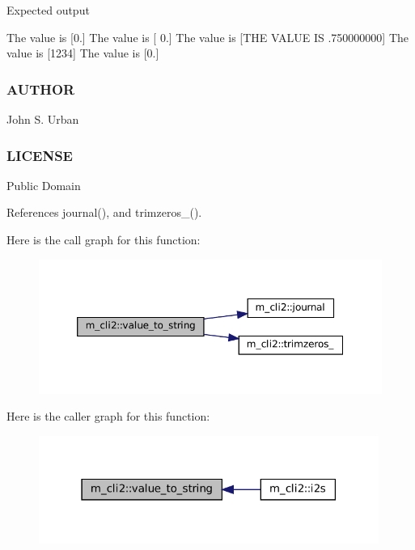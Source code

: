 Expected output

The value is \mbox{[}0.\mbox{]} The value is \mbox{[} 0.\mbox{]} The value is \mbox{[}T\+HE V\+A\+L\+UE IS .750000000\mbox{]} The value is \mbox{[}1234\mbox{]} The value is \mbox{[}0.\mbox{]}

\subsubsection*{A\+U\+T\+H\+OR}

John S. Urban \subsubsection*{L\+I\+C\+E\+N\+SE}

Public Domain 

References journal(), and trimzeros\+\_\+().

Here is the call graph for this function\+:\nopagebreak
\begin{figure}[H]
\begin{center}
\leavevmode
\includegraphics[width=350pt]{namespacem__cli2_a1bbcefd886dabb0286e2cb14ab54034f_cgraph}
\end{center}
\end{figure}
Here is the caller graph for this function\+:\nopagebreak
\begin{figure}[H]
\begin{center}
\leavevmode
\includegraphics[width=315pt]{namespacem__cli2_a1bbcefd886dabb0286e2cb14ab54034f_icgraph}
\end{center}
\end{figure}
\mbox{\label{namespacem__cli2_ab1525b0419475486f520ef502daa5e94}} 
